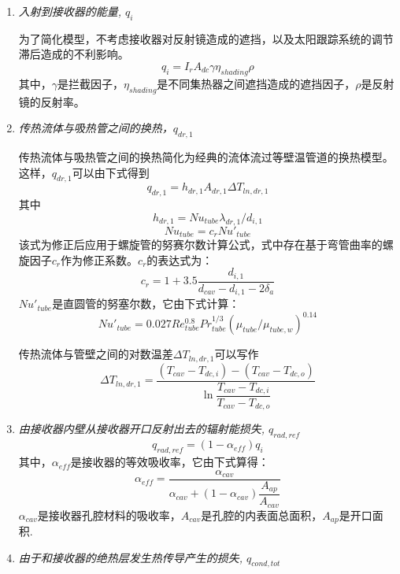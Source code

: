 \begin{enumerate}[label=(\arabic*)]
  \item \emph{入射到接收器的能量, $q_i$}
  
为了简化模型，不考虑接收器对反射镜造成的遮挡，以及太阳跟踪系统的调节滞后造成的不利影响。
  \begin{equation}
      q_i = I_r A_{dc} \gamma \eta_{shading} \rho
      \label{eq:q_i}
  \end{equation}
其中，$\gamma$是拦截因子，$\eta_{shading}$是不同集热器之间遮挡造成的遮挡因子，$\rho$是反射镜的反射率。
  \item \emph{传热流体与吸热管之间的换热，$q_{dr,1}$}
  
  传热流体与吸热管之间的换热简化为经典的流体流过等壁温管道的换热模型。这样，$q_{dr,1}$可以由下式得到
  \begin{equation}
      q_{dr,1} = h_{dr,1}A_{dr,1}\Delta T_{ln,dr,1}
      \label{eq:q_dr_1}
  \end{equation}
  其中  
  \begin{equation}
      h_{dr,1} = Nu_{tube}\lambda_{dr,1} / d_{i,1}
\end{equation}
\begin{equation}
      Nu_{tube} = c_r Nu'_{tube}
\end{equation}
该式为修正后应用于螺旋管的努赛尔数计算公式，式中存在基于弯管曲率的螺旋因子$c_r$作为修正系数。$c_r$的表达式为\cite{Pablo2008}：
\begin{equation}
	c_{r}=1+3.5\frac{d_{i,1}}{d_{cav}-d_{i,1}-2\delta_{a}}
\end{equation}
$Nu'_{tube}$是直圆管的努塞尔数，它由下式计算\cite{Serth2007}：
\begin{equation}
	Nu'_{tube}= 0.027Re_{tube}^{0.8}Pr_{tube}^{1/3}(\mu_{tube}/\mu_{tube,w})^{0.14}
\end{equation}

传热流体与管壁之间的对数温差$\Delta{}T_{ln,dr,1}$可以写作
\begin{equation}
	\Delta{}T_{ln,dr,1}=\frac{(T_{cav}-T_{dc,i})-(T_{cav}-T_{dc,o})}{\ln\dfrac{T_{cav}-T_{dc,i}}{T_{cav}-T_{dc,o}}}
\end{equation}

  \item \emph{由接收器内壁从接收器开口反射出去的辐射能损失, $q_{rad,ref}$}
  \begin{equation}
    q_{rad,ref}=(1-\alpha_{eff})q_{i}
\end{equation}
    其中，$\alpha_{eff}$是接收器的等效吸收率，它由下式算得：
    \begin{equation}
    \alpha_{eff}=\frac{\alpha_{cav}}{\alpha_{cav}+(1-\alpha_{cav})\dfrac{A_{ap}}{A_{cav}}}
    \end{equation} 
$\alpha_{cav}$是接收器孔腔材料的吸收率，$A_{cav}$是孔腔的内表面总面积，$A_{ap}$是开口面积.
  \item \emph{由于和接收器的绝热层发生热传导产生的损失, $q_{cond,tot}$}
  

\end{enumerate}
